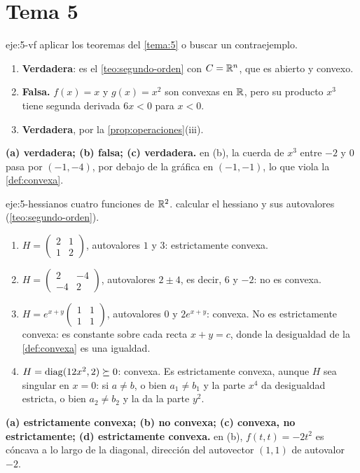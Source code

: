 \section{Tema 5}

\begin{solucion}{eje:5-vf}
\planteamiento aplicar los teoremas del \cref{tema:5} o buscar un contraejemplo.
\pasos
\begin{enumerate}[label=(\alph*)]
  \item \textbf{Verdadera}: es el \cref{teo:segundo-orden} con $C=\mathbb{R}^{n}$, que es abierto y convexo.
  \item \textbf{Falsa.} $f(x)=x$ y $g(x)=x^{2}$ son convexas en $\mathbb{R}$, pero su producto $x^{3}$ tiene segunda derivada $6x<0$ para $x<0$.
  \item \textbf{Verdadera}, por la \cref{prop:operaciones}(iii).
\end{enumerate}
\resultado \textbf{(a) verdadera; (b) falsa; (c) verdadera.}
\comprobacion en (b), la cuerda de $x^{3}$ entre $-2$ y $0$ pasa por $(-1,-4)$, por debajo de la gráfica en $(-1,-1)$, lo que viola la \cref{def:convexa}.
\end{solucion}

\begin{solucion}{eje:5-hessianos}
\datos cuatro funciones de $\mathbb{R}^{2}$.
\planteamiento calcular el hessiano y sus autovalores (\cref{teo:segundo-orden}).
\pasos
\begin{enumerate}[label=(\alph*)]
  \item $H=\begin{pmatrix}2&1\\1&2\end{pmatrix}$, autovalores $1$ y $3$: estrictamente convexa.
  \item $H=\begin{pmatrix}2&-4\\-4&2\end{pmatrix}$, autovalores $2\pm 4$, es decir, $6$ y $-2$: no es convexa.
  \item $H=e^{x+y}\begin{pmatrix}1&1\\1&1\end{pmatrix}$, autovalores $0$ y $2e^{x+y}$: convexa. No es estrictamente convexa: es constante sobre cada recta $x+y=c$, donde la desigualdad de la \cref{def:convexa} es una igualdad.
  \item $H=\operatorname{diag}(12x^{2},2)\succeq 0$: convexa. Es estrictamente convexa, aunque $H$ sea singular en $x=0$: si $a\ne b$, o bien $a_1\ne b_1$ y la parte $x^{4}$ da desigualdad estricta, o bien $a_2\ne b_2$ y la da la parte $y^{2}$.
\end{enumerate}
\resultado \textbf{(a) estrictamente convexa; (b) no convexa; (c) convexa, no estrictamente; (d) estrictamente convexa.}
\comprobacion en (b), $f(t,t)=-2t^{2}$ es cóncava a lo largo de la diagonal, dirección del autovector $(1,1)$ de autovalor $-2$.
\end{solucion}

